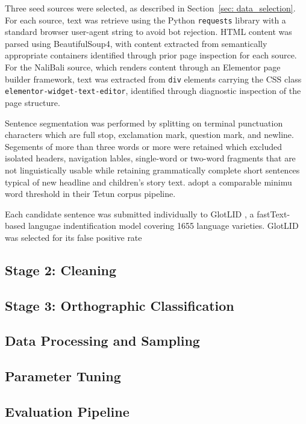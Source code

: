 \documentclass[11pt,a4paper]{article}
\begin{document}
Three seed sources were selected, as described in Section~\ref{sec: data_selection}. For each source, text was retrieve using the Python \texttt{requests} library with a standard browser user-agent string to avoid bot rejection. HTML content was parsed using BeautifulSoup4, with content extracted from semantically appropriate containers identified through prior page inspection for each source. For the NaliBali source, which renders content through an Elementor page builder framework, text was extracted from \texttt{div} elements carrying the CSS class \texttt{elementor-widget-text-editor}, identified through diagnostic inspection of the page structure. 

Sentence segmentation was performed by splitting on terminal punctuation characters which are full stop, exclamation mark, question mark, and newline. Segements of more than three words or more were retained which excluded isolated headers, navigation lables, single-word or two-word fragments that are not linguistically usable while retaining grammatically complete short sentences typical of new headline and children's story text. \citep{de2024data} adopt a comparable minimu word threshold in their Tetun corpus pipeline.

Each candidate sentence was submitted individually to GlotLID \citep{kargaran2024glotcc}, a fastText-based langugae indentification model covering 1655 language varieties. GlotLID was selected for its false positive rate
\subsection{Stage 2: Cleaning}
\subsection{Stage 3: Orthographic Classification}
\subsection{Data Processing and Sampling }
\subsection{Parameter Tuning}
\subsection{Evaluation Pipeline}


  
\end{document}
